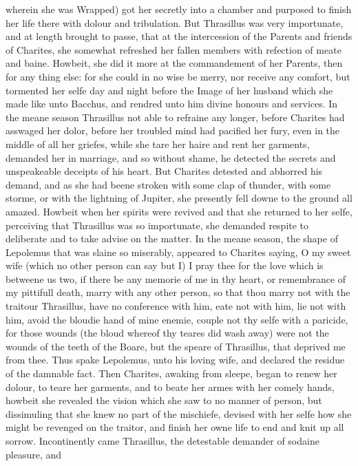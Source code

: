 wherein she was Wrapped) got her secretly into a chamber and purposed to finish
her life there with dolour and tribulation. But Thrasillus was very
importunate, and at length brought to passe, that at the intercession of the
Parents and friends of Charites, she somewhat refreshed her fallen members with
refection of meate and baine. Howbeit, she did it more at the commandement of
her Parents, then for any thing else: for she could in no wise be merry, nor
receive any comfort, but tormented her selfe day and night before the Image of
her husband which she made like unto Bacchus, and rendred unto him divine
honours and services. In the meane season Thrasillus not able to refraine any
longer, before Charites had asswaged her dolor, before her troubled mind had
pacified her fury, even in the middle of all her griefes, while she tare her
haire and rent her garments, demanded her in marriage, and so without shame, he
detected the secrets and unspeakeable deceipts of his heart. But Charites
detested and abhorred his demand, and as she had beene stroken with some clap
of thunder, with some storme, or with the lightning of Jupiter, she presently
fell downe to the ground all amazed. Howbeit when her spirits were revived and
that she returned to her selfe, perceiving that Thrasillus was so importunate,
she demanded respite to deliberate and to take advise on the matter. In the
meane season, the shape of Lepolemus that was slaine so miserably, appeared to
Charites saying, O my sweet wife (which no other person can say but I) I pray
thee for the love which is betweene us two, if there be any memorie of me in
thy heart, or remembrance of my pittifull death, marry with any other person,
so that thou marry not with the traitour Thrasillus, have no conference with
him, eate not with him, lie not with him, avoid the bloudie hand of mine
enemie, couple not thy selfe with a paricide, for those wounds (the bloud
whereof thy teares did wash away) were not the wounds of the teeth of the
Boare, but the speare of Thrasillus, that deprived me from thee. Thus spake
Lepolemus, unto his loving wife, and declared the residue of the damnable fact.
Then Charites, awaking from sleepe, began to renew her dolour, to teare her
garments, and to beate her armes with her comely hands, howbeit she revealed
the vision which she saw to no manner of person, but dissimuling that she knew
no part of the mischiefe, devised with her selfe how she might be revenged on
the traitor, and finish her owne life to end and knit up all sorrow.
Incontinently came Thrasillus, the detestable demander of sodaine pleasure, and
